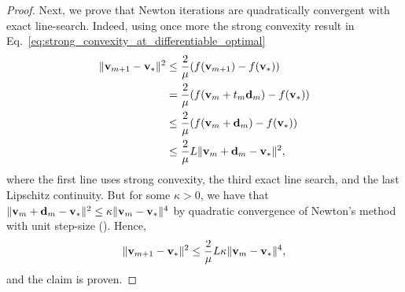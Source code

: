 \begin{theorem}
\begin{proof}
    Next, we prove that Newton iterations are quadratically convergent
  with exact line-search. Indeed, using once more the strong convexity result in Eq.~\eqref{eq:strong_convexity_at_differentiable_optimal}
  \begin{align*}
    \|{\mathbf{v}}_{m+1} - {\mathbf{v}}_*\|^2&\le \frac{2}{\mu} ( f({\mathbf{v}}_{m+1}) - f({\mathbf{v}}_*)) \\
                    &= \frac{2}{\mu} ( f({\mathbf{v}}_m + t_m {\mathbf{d}}_m   ) - f({\mathbf{v}}_*)) \\
                    &\le \frac{2}{\mu} ( f({\mathbf{v}}_m + {\mathbf{d}}_m   ) - f({\mathbf{v}}_*)) \\
                    &\le \frac{2}{\mu} L \|{\mathbf{v}}_m + {\mathbf{d}}_m - {\mathbf{v}}_*\|^2,
  \end{align*}
    where the first line uses strong convexity,
    the third exact line search, and the last
    Lipschitz continuity. But for some $\kappa > 0$,
    we have that $\|{\mathbf{v}}_m + {\mathbf{d}}_m - {\mathbf{v}}_*\|^2 \le \kappa \|{\mathbf{v}}_{m} - {\mathbf{v}}_*\|^4$
    by quadratic convergence of Newton's method with unit step-size (\cite[Theorem 3.5]{bib:nocedal2006numerical}).
    Hence,
    \[
      \|{\mathbf{v}}_{m+1} - {\mathbf{v}}_*\|^2 \le \frac{2}{\mu}  L \kappa \|{\mathbf{v}}_{m} - {\mathbf{v}}_*\|^4,
    \]
    and the claim is proven.
  \end{proof}
\end{theorem}
